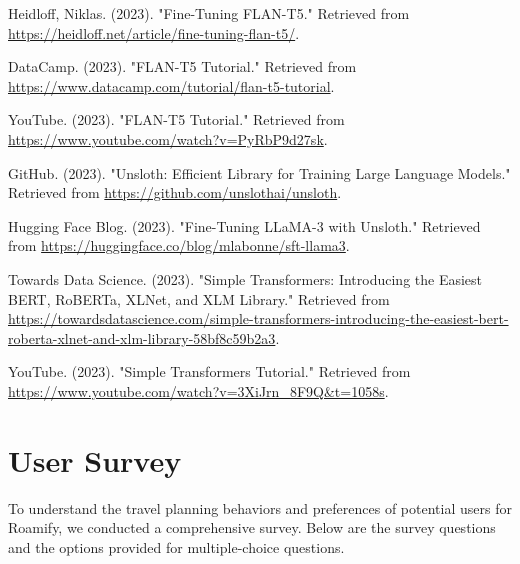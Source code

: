 \documentclass[conference]{IEEEtran}
\begin{document}
\begin{thebibliography}{1}
    Heidloff, Niklas. (2023). "Fine-Tuning FLAN-T5." Retrieved from \url{https://heidloff.net/article/fine-tuning-flan-t5/}.

    DataCamp. (2023). "FLAN-T5 Tutorial." Retrieved from \url{https://www.datacamp.com/tutorial/flan-t5-tutorial}.

    YouTube. (2023). "FLAN-T5 Tutorial." Retrieved from \url{https://www.youtube.com/watch?v=PyRbP9d27sk}.

    GitHub. (2023). "Unsloth: Efficient Library for Training Large Language Models." Retrieved from \url{https://github.com/unslothai/unsloth}.

    Hugging Face Blog. (2023). "Fine-Tuning LLaMA-3 with Unsloth." Retrieved from \url{https://huggingface.co/blog/mlabonne/sft-llama3}.

    Towards Data Science. (2023). "Simple Transformers: Introducing the Easiest BERT, RoBERTa, XLNet, and XLM Library." Retrieved from \url{https://towardsdatascience.com/simple-transformers-introducing-the-easiest-bert-roberta-xlnet-and-xlm-library-58bf8c59b2a3}.

    YouTube. (2023). "Simple Transformers Tutorial." Retrieved from \url{https://www.youtube.com/watch?v=3XiJrn_8F9Q&t=1058s}.
    
\end{thebibliography}

\newpage

\appendix

\section{User Survey}
    To understand the travel planning behaviors and preferences of potential users for Roamify, we conducted a comprehensive survey. Below are the survey questions and the options provided for multiple-choice questions.
\end{document}
